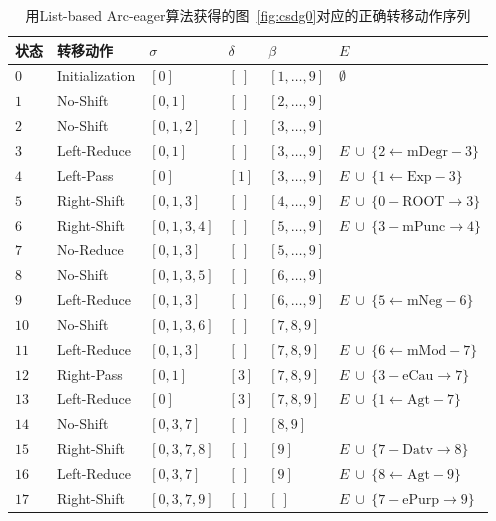 \begin{table}[thbp]
	\centering
	\small
	\renewcommand{\arraystretch}{1.2}
	\begin{tabular}{C{3em}L{7em}R{4.5em}C{4em}L{4em}L{9em}}
		\hline
		\bf 状态 & \bf 转移动作 & $\sigma$ & $\delta$ & $\beta$ & $E$ \\
		\hline
		$0$ & Initialization & $[0]$ & $[\ ]$ & $[1, \dots, 9]$ & $\emptyset $ \\
		$1$ & No-Shift & $[0, 1]$ & $[\ ]$ & $[2, \dots, 9]$ &  \\
		$2$ & No-Shift & $[0, 1, 2]$ & $[\ ]$ & $[3, \dots, 9]$ &  \\
		$3$ & Left-Reduce & $[0, 1]$ & $[\ ]$ & $[3, \dots, 9]$ & $E\ \cup\ \{2\leftarrow \textrm{mDegr}-3\}$ \\
		$4$ & Left-Pass & $[0]$ & $[1]$ & $[3, \dots, 9]$ & $E\ \cup\ \{1\leftarrow \textrm{Exp}-3\}$ \\
		$5$ & Right-Shift & $[0, 1, 3]$ & $[\ ]$ & $[4, \dots, 9]$ & $E\ \cup\ \{0- \textrm{ROOT}\rightarrow 3\}$ \\
		$6$ & Right-Shift & $[0, 1, 3, 4]$ & $[\ ]$ & $[5, \dots, 9]$ & $E\ \cup\ \{3- \textrm{mPunc}\rightarrow 4\}$ \\
		$7$ & No-Reduce & $[0, 1, 3]$ & $[\ ]$ & $[5, \dots, 9]$ &  \\
		$8$ & No-Shift & $[0, 1, 3, 5]$ & $[\ ]$ & $[6, \dots, 9]$ &  \\
		$9$ & Left-Reduce & $[0, 1, 3]$ & $[\ ]$ & $[6, \dots, 9]$ & $E\ \cup\ \{5\leftarrow \textrm{mNeg}-6\}$ \\
		$10$ & No-Shift & $[0, 1, 3, 6]$ & $[\ ]$ & $[7, 8, 9]$ &  \\
		$11$ & Left-Reduce & $[0, 1, 3]$ & $[\ ]$ & $[7, 8, 9]$ & $E\ \cup\ \{6\leftarrow \textrm{mMod}-7\}$ \\
		$12$ & Right-Pass & $[0, 1]$ & $[3]$ & $[7, 8, 9]$ & $E\ \cup\ \{3- \textrm{eCau}\rightarrow 7\}$ \\
		$13$ & Left-Reduce & $[0]$ & $[3]$ & $[7, 8, 9]$ & $E\ \cup\ \{1\leftarrow \textrm{Agt}-7\}$ \\
		$14$ & No-Shift & $[0, 3, 7]$ & $[\ ]$ & $[8, 9]$ &  \\
		$15$ & Right-Shift & $[0, 3, 7, 8]$ & $[\ ]$ & $[9]$ & $E\ \cup\ \{7- \textrm{Datv}\rightarrow 8\}$ \\
		$16$ & Left-Reduce & $[0, 3, 7]$ & $[\ ]$ & $[9]$ & $E\ \cup\ \{8\leftarrow \textrm{Agt}-9\}$ \\
		$17$ & Right-Shift & $[0, 3, 7, 9]$ & $[\ ]$ & $[\ ]$ & $E\ \cup\ \{7- \textrm{ePurp}\rightarrow 9\}$ \\
		\hline
	\end{tabular}
	\caption{用List-based Arc-eager算法获得的图~\ref{fig:csdg0}对应的正确转移动作序列}
	\label{tbl:trans-seq}
\end{table}

